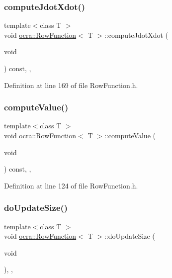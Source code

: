 \subsubsection{\texorpdfstring{compute\+Jdot\+Xdot()}{computeJdotXdot()}}
{\footnotesize\ttfamily template$<$class T $>$ \\
void \hyperlink{classocra_1_1RowFunction}{ocra\+::\+Row\+Function}$<$ T $>$\+::compute\+Jdot\+Xdot (\begin{DoxyParamCaption}\item[{void}]{ }\end{DoxyParamCaption}) const\hspace{0.3cm}{\ttfamily [inline]}, {\ttfamily [protected]}, {\ttfamily [virtual]}}



Definition at line 169 of file Row\+Function.\+h.

\hypertarget{classocra_1_1RowFunction_a99dfb80d85d71b217b49c9ef22dcd361}{}\label{classocra_1_1RowFunction_a99dfb80d85d71b217b49c9ef22dcd361} 
\subsubsection{\texorpdfstring{compute\+Value()}{computeValue()}}
{\footnotesize\ttfamily template$<$class T $>$ \\
void \hyperlink{classocra_1_1RowFunction}{ocra\+::\+Row\+Function}$<$ T $>$\+::compute\+Value (\begin{DoxyParamCaption}\item[{void}]{ }\end{DoxyParamCaption}) const\hspace{0.3cm}{\ttfamily [inline]}, {\ttfamily [protected]}, {\ttfamily [virtual]}}



Definition at line 124 of file Row\+Function.\+h.

\hypertarget{classocra_1_1RowFunction_ae2072d38459752174b456af8497da969}{}\label{classocra_1_1RowFunction_ae2072d38459752174b456af8497da969} 
\subsubsection{\texorpdfstring{do\+Update\+Size()}{doUpdateSize()}}
{\footnotesize\ttfamily template$<$class T $>$ \\
void \hyperlink{classocra_1_1RowFunction}{ocra\+::\+Row\+Function}$<$ T $>$\+::do\+Update\+Size (\begin{DoxyParamCaption}\item[{void}]{ }\end{DoxyParamCaption})\hspace{0.3cm}{\ttfamily [inline]}, {\ttfamily [protected]}, {\ttfamily [virtual]}}



